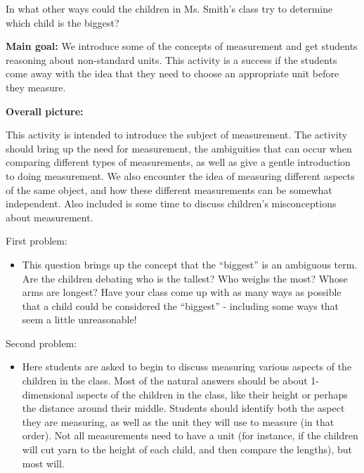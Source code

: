 \documentclass[nooutcomes,noauthor]{ximera}
\begin{document}
\begin{problem}
    In what other ways could the children in Ms. Smith's class try to determine which child is the biggest?
    
   
\end{problem}


\newpage

\begin{instructorNotes}

{\bf Main goal:} We introduce some of the concepts of measurement and get students reasoning about non-standard units. This activity is a success if the students come away with the idea that they need to choose an appropriate unit before they measure.

{\bf Overall picture:}

This activity is intended to introduce the subject of measurement.  The activity should bring up the need for measurement, the ambiguities that can occur when comparing different types of measurements, as well as give a gentle introduction to doing measurement.  We also encounter the idea of measuring different aspects of the same object, and how these different measurements can be somewhat independent.  Also included is some time to discuss children's misconceptions about measurement.

First problem:
\begin{itemize}
	\item         This question brings up the concept that the ``biggest'' is an ambiguous term.  Are the children debating who is the tallest?  Who weighs the most?  Whose arms are longest?  Have your class come up with as many ways as possible that a child could be considered the ``biggest'' - including some ways that seem a little unreasonable!
\end{itemize}


Second problem:
\begin{itemize}
 \item Here students are asked to begin to discuss measuring various aspects of the children in the class.  Most of the natural answers should be about 1-dimensional aspects of the children in the class, like their height or perhaps the distance around their middle.  Students should identify both the aspect they are measuring, as well as the unit they will use to measure (in that order).  Not all measurements need to have a unit (for instance, if the children will cut yarn to the height of each child, and then compare the lengths), but most will.  
        

\end{itemize}
\end{instructorNotes}
\end{document}
